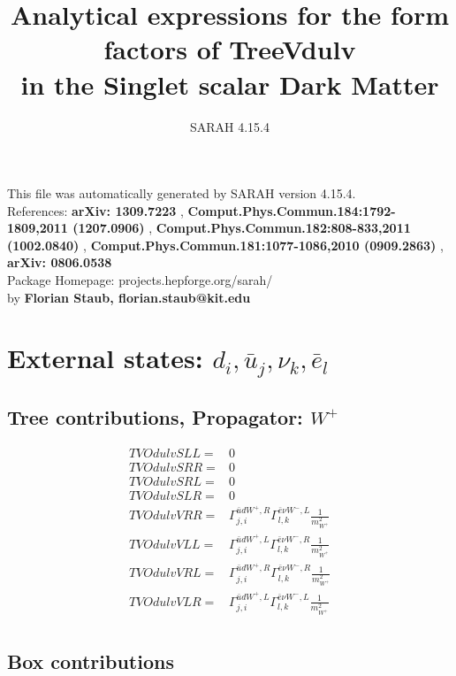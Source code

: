\documentclass[A4,landscape]{article}
\begin{document}
\title{Analytical expressions for the form factors of TreeVdulv\\ in the Singlet scalar Dark Matter } 
 \author{SARAH 4.15.4} 
 \maketitle 
 \vspace{10cm} 
This file was automatically generated by SARAH version 4.15.4.  \\ 
References: {\bf arXiv: 1309.7223 }, {\bf Comput.Phys.Commun.184:1792-1809,2011 (1207.0906) }, {\bf Comput.Phys.Commun.182:808-833,2011 (1002.0840) }, {\bf Comput.Phys.Commun.181:1077-1086,2010 (0909.2863) }, {\bf arXiv: 0806.0538 } \\ 
Package Homepage: projects.hepforge.org/sarah/ \\ 
by {\bf Florian Staub, florian.staub@kit.edu} 
 \pagebreak 
 \tableofcontents 
 \pagebreak 
\section{External states: ${d_{{i}}, \bar{u}_{{j}}, \nu_{{k}}, \bar{e}_{{l}}}$} 
\subsection{Tree contributions, Propagator: $W^+$} 

\begin{align} 
  TVOdulvSLL= & 0 \\ 
  TVOdulvSRR= & 0 \\ 
  TVOdulvSRL= & 0 \\ 
  TVOdulvSLR= & 0 \\ 
  TVOdulvVRR= & \Gamma^{\bar{u}d W^+ ,R}_{j, i} \Gamma^{\bar{e}\nu W^-,L}_{l, k} \frac{1}{m^2_{W^+}} \\ 
  TVOdulvVLL= & \Gamma^{\bar{u}d W^+ ,L}_{j, i} \Gamma^{\bar{e}\nu W^-,R}_{l, k} \frac{1}{m^2_{W^+}} \\ 
  TVOdulvVRL= & \Gamma^{\bar{u}d W^+ ,R}_{j, i} \Gamma^{\bar{e}\nu W^-,R}_{l, k} \frac{1}{m^2_{W^+}} \\ 
  TVOdulvVLR= & \Gamma^{\bar{u}d W^+ ,L}_{j, i} \Gamma^{\bar{e}\nu W^-,L}_{l, k} \frac{1}{m^2_{W^+}} \\ 
\end{align} 
\subsection{Box contributions} 
\end{document}
